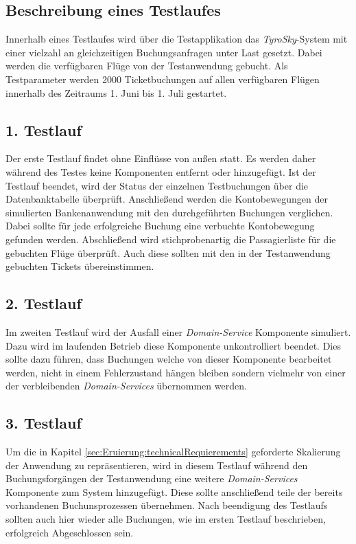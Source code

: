 \subsection{Beschreibung eines Testlaufes}
Innerhalb eines Testlaufes wird über die Testapplikation das \textit{TyroSky}-System mit einer vielzahl an gleichzeitigen Buchungsanfragen unter Last gesetzt. Dabei werden die verfügbaren Flüge von der Testanwendung gebucht. Als Testparameter werden {2000} Ticketbuchungen auf allen verfügbaren Flügen innerhalb des Zeitraums 1. Juni bis 1. Juli gestartet. \\

\subsection{1. Testlauf}
Der erste Testlauf findet ohne Einflüsse von außen statt. Es werden daher während des Testes keine Komponenten entfernt oder hinzugefügt. Ist der Testlauf beendet, wird der Status der einzelnen Testbuchungen über die Datenbanktabelle überprüft. Anschließend werden die Kontobewegungen der simulierten Bankenanwendung mit den durchgeführten Buchungen verglichen. Dabei sollte für jede erfolgreiche Buchung eine verbuchte Kontobewegung gefunden werden. Abschließend wird stichprobenartig die Passagierliste für die gebuchten Flüge überprüft. Auch diese sollten mit den in der Testanwendung gebuchten Tickets übereinstimmen. \\

\subsection{2. Testlauf}
Im zweiten Testlauf wird der Ausfall einer \textit{Domain-Service} Komponente simuliert. Dazu wird im laufenden Betrieb diese Komponente unkontrolliert beendet. Dies sollte dazu führen, dass Buchungen welche von dieser Komponente bearbeitet werden, nicht in einem Fehlerzustand hängen bleiben sondern vielmehr von einer der verbleibenden \textit{Domain-Services} übernommen werden. 

\subsection{3. Testlauf}
Um die in Kapitel \ref{sec:Eruierung:technicalRequierements} geforderte Skalierung der Anwendung zu repräsentieren, wird in diesem Testlauf während den Buchungsforgängen der Testanwendung eine weitere  \textit{Domain-Services} Komponente zum System hinzugefügt. Diese sollte anschließend teile der bereits vorhandenen Buchunsprozessen übernehmen. Nach beendigung des Testlaufs sollten auch hier wieder alle Buchungen, wie im ersten Testlauf beschrieben, erfolgreich Abgeschlossen sein. 


